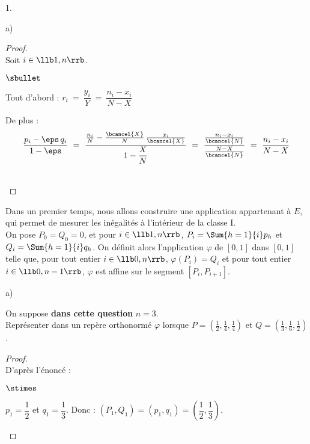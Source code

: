 \documentclass[11pt]{article}%
\begin{document}
\begin{noliste}{1.}
\begin{noliste}{a)}
  \begin{proof}~\\
    Soit $i\in \llb 1,n \rrb$.
    \begin{noliste}{$\sbullet$}
      \item Tout d'abord :
      $r_i \ = \ \dfrac{y_i}{Y} \ = \ \dfrac{n_i-x_i}{N-X}$
      
      \item De plus : 
      \[
        \dfrac{p_i-\eps \, q_i}{1-\eps} \ = \ \dfrac{\frac{n_i}{N}
        - \frac{\bcancel{X}}{N} \, \frac{x_i}{\bcancel{X}}}
        {1-\dfrac{X}{N}} \ = \ \dfrac{\frac{n_i-x_i}{\bcancel{N}}}
        {\frac{N-X}{\bcancel{N}}} \ = \ \dfrac{n_i-x_i}{N-X}
      \]
    \end{noliste}
    ~\\[-1cm]
  \end{proof}
 \end{noliste}
 
 
 
 
 
 
 \item Dans un premier temps, nous allons construire une application 
 appartenant à $E$, qui permet de mesurer les inégalités à l'intérieur 
 de la classe I.\\
 On pose $P_0=Q_0=0$, et pour $i \in \llb 1,n \rrb$, $P_i= \Sum{h=1}{i} 
 p_h$ et $Q_i=\Sum{h=1}{i} q_h$. On définit alors l'application 
 $\varphi$ de $[0,1]$ dans $[0,1]$ telle que, pour tout entier $i \in 
 \llb 0,n \rrb$, $\varphi(P_i)=Q_i$ et pour tout entier $i \in \llb 
 0,n-1 \rrb$, $\varphi$ est affine sur le segment $[P_i, P_{i+1}]$. 
 \begin{noliste}{a)}
  \setlength{\itemsep}{2mm}
  \item On suppose \textbf{dans cette question} $n=3$.\\
  Représenter dans un repère orthonormé $\varphi$ lorsque $P= \left( 
  \frac{1}{2}, \frac{1}{4}, \frac{1}{4} \right)$ et $Q=\left( 
  \frac{1}{3}, \frac{1}{6}, \frac{1}{2}  \right)$. 
  
  \begin{proof}~\\
  D'après l'énoncé :
  \begin{noliste}{$\stimes$}
    \item $p_1=\dfrac{1}{2}$ et $q_1 = \dfrac{1}{3}$. Donc : $(P_1,Q_1)
    =(p_1,q_1) = \left(\dfrac{1}{2}, \dfrac{1}{3}\right)$.
    

\end{noliste}
\end{proof}
\end{noliste}
\end{noliste}
\end{document}
